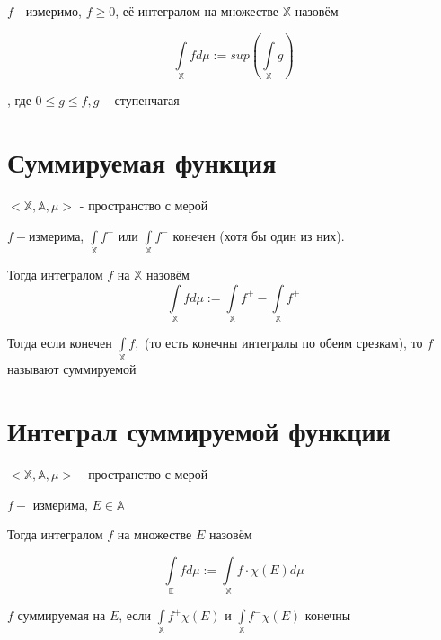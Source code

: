 \documentclass[paper=a4, fontsize=15pt]{article}
\begin{document}
$f$ - измеримо, $f \geqslant 0$, её интегралом на множестве $\mathds{X}$ назовём

$$\int\limits_{\mathds{X}} f d\mu := sup (\int\limits_{\mathds{X}} g)$$

, где $0 \leqslant g \leqslant f, g - $ступенчатая

\section{Суммируемая функция}
$<\mathds{X}, \mathds{A}, \mu>$ - пространство с мерой

$f - $измерима, $\int\limits_{\mathds{X}}f^+$ или $\int\limits_{\mathds{X}}f^-$ конечен (хотя бы один из них).

Тогда интегралом $f$ на $\mathds{X}$ назовём $$\int\limits_{\mathds{X}}f d\mu := \int\limits_{\mathds{X}}f^+ - \int\limits_{\mathds{X}}f^+$$

Тогда если конечен $\int\limits_{\mathds{X}} f,$ (то есть конечны интегралы по обеим срезкам), то $f$ называют суммируемой

\section{Интеграл суммируемой функции}
$<\mathds{X}, \mathds{A}, \mu>$ - пространство с мерой

$f -$ измерима, $E \in \mathds{A}$

Тогда интегралом $f$ на множестве $E$ назовём

$$\int\limits_{\mathds{E}}f d\mu := \int\limits_{\mathds{X}}f \cdot \chi(E) d\mu$$

$f$ суммируемая на $E$, если $\int\limits_{\mathds{X}}f^+ \chi(E)$ и $\int\limits_{\mathds{X}}f^- \chi(E)$ конечны
\end{document}
